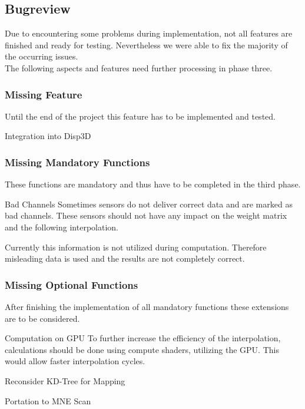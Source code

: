 \subsection{Bugreview}
Due to encountering some problems during implementation, not all features are finished and ready for testing.
Nevertheless we were able to fix the majority of the occurring issues. \\ 
The following aspects and features need further processing in phase three. 

\subsubsection{Missing Feature}
Until the end of the project this feature has to be implemented and tested.

\begin{aims}
	\item[Integration into Disp3D]
\end{aims}

\subsubsection{Missing Mandatory Functions}
These functions are mandatory and thus have to be completed in the third phase.

\begin{aims}
	\item[Bad Channels]Sometimes sensors do not deliver correct data and are marked as bad channels. These sensors should not have                          					   any impact on the weight matrix and the following interpolation. 
	
					   Currently this information is not utilized during computation. Therefore misleading data is used and the 							   results are not completely correct.   
\end{aims}

\subsubsection{Missing Optional Functions}
After finishing the implementation of all mandatory functions these extensions are to be considered.

\begin{aims}
	\item[Computation on GPU]To further increase the efficiency of the interpolation, calculations should be done using compute                							 shaders, utilizing the GPU. This would allow faster interpolation cycles.
	\item[Reconsider KD-Tree for Mapping]
	\item[Portation to MNE Scan]
\end{aims}